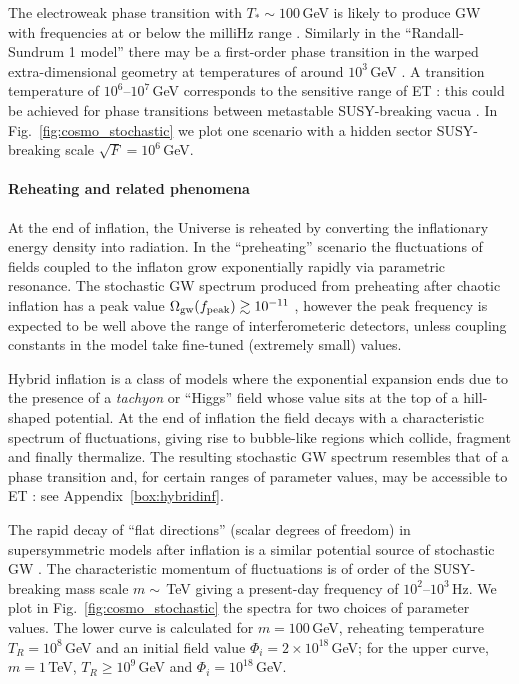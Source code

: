 The electroweak phase transition with $T_\ast \sim 100\,$GeV is likely to produce GW with frequencies at or below the milliHz range  %
\cite{Kahniashvili:2008pf}. Similarly in the ``Randall-Sundrum 1 model''
there may be a first-order phase transition in the warped extra-dimensional geometry at temperatures of around $10^3\,$GeV
\cite{RandallServant2007}. A transition temperature of $10^6$--$10^7\,$GeV corresponds to the sensitive range of ET \cite{Grojean:2006bp}: this could be achieved for phase transitions between metastable SUSY-breaking vacua \cite{Craig:2009zx}. In Fig.~\ref{fig:cosmo_stochastic} we plot one scenario with a hidden sector SUSY-breaking scale $\sqrt{F}=10^6\,$GeV.

\paragraph{Reheating and related phenomena}

At the end of inflation, the Universe is reheated by converting the inflationary energy density into radiation. %
In the ``preheating'' scenario the fluctuations of fields coupled to the inflaton grow exponentially rapidly via parametric resonance.  The stochastic GW spectrum produced from preheating after chaotic inflation has a peak value $\Omega_{\rm gw}(f_{\rm peak}) \gtrsim10^{-11}$ \cite{Easther:2006gt,Dufaux:2007pt}, however the peak frequency is expected to be well above the range of interferometeric detectors, unless coupling constants in the model take fine-tuned (extremely small) values.

Hybrid inflation is a class of models where the exponential expansion ends due to the presence of a {\it tachyon}\/ or ``Higgs'' field whose value sits at the top of a hill-shaped potential. At the end of inflation the field decays 
with a characteristic spectrum of fluctuations, giving rise to bubble-like regions which collide, fragment and finally thermalize. The resulting stochastic GW spectrum resembles that of a phase transition and, for certain ranges of parameter values, may be accessible to ET \cite{GarciaBellido:2007af,Dufaux:2008dn}: see Appendix~\ref{box:hybridinf}. 

The rapid decay of ``flat directions'' (scalar degrees of freedom) in supersymmetric models after inflation is a similar potential source of stochastic GW \cite{Dufaux:2009wn}. The characteristic momentum of fluctuations is of order of the SUSY-breaking mass scale $m\sim$\,TeV giving a present-day frequency of $10^2$--$10^3\,$Hz. We plot in Fig.~\ref{fig:cosmo_stochastic} the spectra for two choices of parameter values. The lower curve is calculated for $m=100\,$GeV, reheating temperature $T_R=10^8\,$GeV and an initial field value $\Phi_i = 2\times 10^{18}\,$GeV; for the upper curve, $m=1\,$TeV, $T_R\geq 10^9\,$GeV and $\Phi_i=10^{18}\,$GeV.

